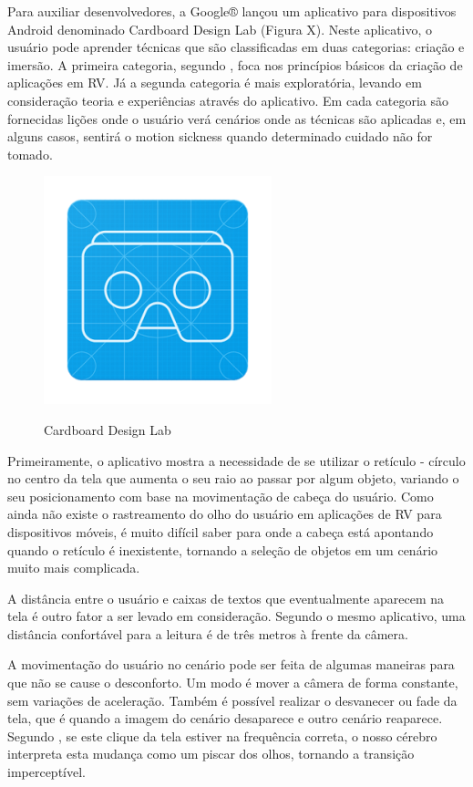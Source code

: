 Para auxiliar desenvolvedores, a Google® lançou um aplicativo para dispositivos Android denominado Cardboard Design Lab (Figura X). Neste aplicativo, o usuário pode aprender técnicas que são classificadas em duas categorias: criação e imersão. A primeira categoria, segundo , foca nos princípios básicos da criação de aplicações em RV. Já a segunda categoria é mais exploratória, levando em consideração teoria e experiências através do aplicativo. Em cada categoria são fornecidas lições onde o usuário verá cenários onde as técnicas são aplicadas e, em alguns casos, sentirá o motion sickness quando determinado cuidado não for tomado. 

\begin{figure}[h]
	\caption{\small Cardboard Design Lab}
	\centering
	\includegraphics[scale=0.7]{Imagens/designlab.png}
	\label{f.designlab}
\end{figure}

Primeiramente, o aplicativo mostra a necessidade de se utilizar o retículo - círculo no centro da tela que aumenta o seu raio ao passar por algum objeto, variando o seu posicionamento com base na movimentação de cabeça do usuário. Como ainda não existe o rastreamento do olho do usuário em aplicações de RV para dispositivos móveis, é muito difícil saber para onde a cabeça está apontando quando o retículo é inexistente, tornando a seleção de objetos em um cenário muito mais complicada. 

A distância entre o usuário e caixas de textos que eventualmente aparecem na tela é outro fator a ser levado em consideração. Segundo o mesmo aplicativo, uma distância confortável para a leitura é de três metros à frente da câmera. 

A movimentação do usuário no cenário pode ser feita de algumas maneiras para que não se cause o desconforto. Um modo é mover a câmera de forma constante, sem variações de aceleração. Também é possível realizar o desvanecer ou fade da tela, que é quando a imagem do cenário desaparece e outro cenário reaparece. Segundo , se este clique da tela estiver na frequência correta, o nosso cérebro interpreta esta mudança como um piscar dos olhos, tornando a transição imperceptível. 


